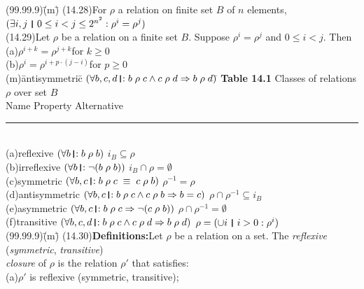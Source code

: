\documentclass{amsart}
\newcommand{\lgap}{2pt}                             %
\newcommand{\lllgap}{12pt}                          %
\newcommand{\equivs}{\ensuremath{\;\equiv\;}}       %
\newcommand{\impl}{\ensuremath{\Rightarrow}}        %
\newcommand{\thedr}{\rule[-.25ex]{.32mm}{1.75ex}}   %
\newcommand{\dr}{\;\,\thedr\,\;}                    %
\newcommand{\rb}{:}                                 %
\newcommand{\drrb}{\;\thedr\,{:}\;}                 %
\newcommand{\all}{\forall}                          %
\newcommand{\ext}{\exists}                          %
\begin{document}
\newpage

\begin{tabbing}
(99.99.9)\;\=(m)\;\=\kill
(14.28)\>For $\rho$ a relation on finite set $B$ of $n$ elements,\\[\lgap]
       \>$(\ext i,j\dr 0\le i < j \le 2^{n^{2}}\rb \rho^{i} = \rho^{j})$\\[\lgap]
(14.29)\>Let $\rho$ be a relation on a finite set $B$. Suppose $\rho^{i} = \rho^{j}$ and $0\le i < j$. Then\\[\lgap]
       \>(a)\>$\rho^{i+k} = \rho^{j+k}$\quad for $k\ge 0$\\[\lgap]
       \>(b)\>$\rho^{i} = \rho^{i+p\cdot(j-i)}$\quad for $p\ge 0$\\[\lllgap]
(m)\;\=antisymmetric\quad\quad\= $(\all b,c,d\drrb b\;\rho\;c \land c\;\rho\;d \impl b\;\rho\; d)$\quad\quad\=\kill
\textbf{Table 14.1} Classes of relations $\rho$ over set $B$\\[\lgap]
\>   Name                \>Property           \>Alternative\\[-8pt]
\rule{5in}{0.5pt}\\
(a)\>reflexive           \>$(\all b\drrb b\;\rho\; b)$                                       \>$i_{B}\subseteq \rho$\\[\lgap]
(b)\>irreflexive         \>$(\all b\drrb \neg(b\;\rho\; b))$                                 \>$i_{B}\cap \rho = \emptyset$\\[\lgap]
(c)\>symmetric           \>$(\all b,c\drrb b\;\rho\;c \equivs c\;\rho\; b)$                  \>$\rho^{-1} = \rho$\\[\lgap]
(d)\>antisymmetric       \>$(\all b,c\drrb b\;\rho\;c \land c\;\rho\; b \impl b = c)$        \>$\rho\cap\rho^{-1}\subseteq i_{B}$\\[\lgap]
(e)\>asymmetric          \>$(\all b,c\drrb b\;\rho\;c \impl \neg(c\;\rho\; b))$              \>$\rho\cap\rho^{-1} = \emptyset$\\[\lgap]
(f)\>transitive          \>$(\all b,c,d\drrb b\;\rho\;c \land c\;\rho\;d \impl b\;\rho\; d)$ \>$\rho = (\cup i\dr i > 0\rb \rho^{i})$\\[\lllgap]
(99.99.9)\;\=(m)\;\=\kill
(14.30)\>\textbf{Definitions:}\quad Let $\rho$ be a relation on a set. The \emph{reflexive} (\emph{symmetric}, \emph{transitive})\\[\lgap]
       \>\emph{closure} of $\rho$ is the relation $\rho'$ that satisfies:\\[\lgap]
       \>(a)\>$\rho'$ is reflexive (symmetric, transitive);\\[\lgap]

\end{tabbing}
\end{document}

